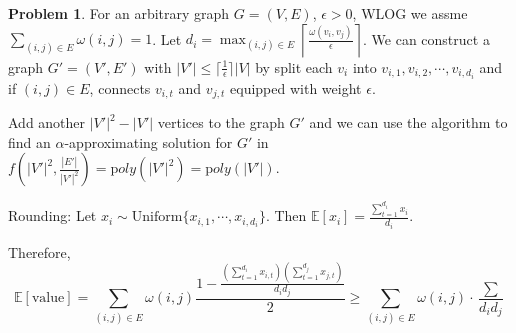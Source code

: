 \documentclass[a4paper]{article}
\theoremstyle{definition}
\newtheorem{problem}{Problem}
\theoremstyle{plain}
\newcommand{\Ebb}{\mathbb E}
\newcommand{\dps}{\displaystyle}
\newcommand{\<}{\left<}
\renewcommand{\>}{\right>}
\numberwithin{equation}{problem}
\newcommand{\ie}{ \textit{ i.e. } }
\newcommand{\st}{ \textit{ s.t. }}
\begin{document}
\begin{problem}
  For an arbitrary graph $ G=(V,E) $,  $ \epsilon>0 $, WLOG we assme  $ \dps\sum_{(i,j)\in E}\omega(i,j)=1 $.  Let  $\dps d_i=\max_{(i,j)\in E}\left\lceil \frac{\omega(v_i,v_j)}{\epsilon} \right\rceil  $. We can construct a graph  $ G'=(V',E') $ with  $ |V'| \leq \lceil\frac{1}{\epsilon}\rceil|V| $ by split each  $ v_i $ into  $ v_{i,1},v_{i,2},\cdots,v_{i,d_i} $ and if  $ (i,j)\in E $, connects  $ v_{i,t} $   and  $ v_{j,t} $ equipped with weight  $ \epsilon $.
  
  Add another  $ |V'|^2-|V'| $ vertices to the graph  $ G' $ and we can use the algorithm to find an  $ \alpha $-approximating solution for  $ G' $ in  $ f(|V'|^2,\dps\frac{|E'|}{|V'|^2})=\mathrm poly(|V'|^2)=\mathrm poly(|V'|) $.

  Rounding: Let  $ x_i\sim \mathrm{Uniform}\{x_{i,1},\cdots,x_{i,d_i}\} $. Then  $ \dps\Ebb[x_i]=\dps\frac{\sum_{t=1}^{d_i}x_i}{d_i} $.
  
  
  Therefore, 
  \[\Ebb[\text{value}]=\sum_{(i,j)\in E}\omega(i,j)\frac{1-\frac{(\sum_{t=1}^{d_i}x_{i,t})(\sum_{t=1}^{d_j}x_{j,t})}{d_id_j}}{2} \geq \sum_{(i,j)\in E}\omega(i,j)\cdot\frac{\sum}{d_id_j}\]




  
  

\end{problem}
\end{document}
